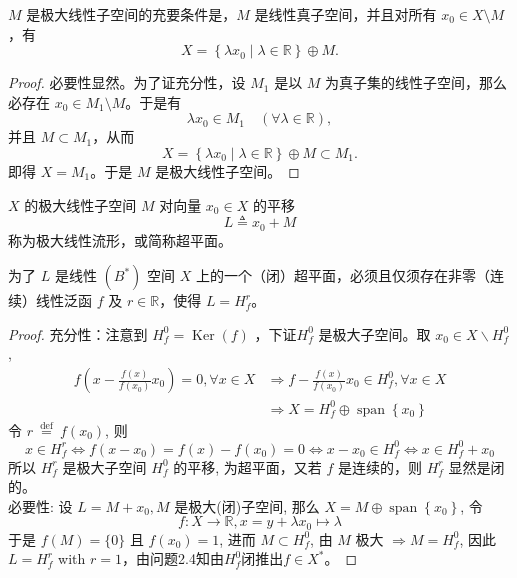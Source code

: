 \documentclass[lang=cn,newtx,10pt,scheme=chinese,thmcnt=chapter]{elegantbook}
\begin{document}
\begin{proposition}
    \( M \) 是极大线性子空间的充要条件是，\( M \) 是线性真子空间，并且对所有 \( x_0 \in X \setminus M \)，有
    \[
    X = \left\{ \lambda x_0 \mid \lambda \in \mathbb{R} \right\} \oplus M.
    \]
\end{proposition}

\begin{proof}
    必要性显然。为了证充分性，设 \( M_1 \) 是以 \( M \) 为真子集的线性子空间，那么必存在 \( x_0 \in M_1 \setminus M \)。于是有
    \[
    \lambda x_0 \in M_1 \quad (\forall \lambda \in \mathbb{R}),
    \]
    并且 \( M \subset M_1 \)，从而
    \[
    X = \left\{ \lambda x_0 \mid \lambda \in \mathbb{R} \right\} \oplus M \subset M_1.
    \]
    即得 \( X = M_1 \)。于是 \( M \) 是极大线性子空间。
\end{proof}



\begin{definition}
    \( X \) 的极大线性子空间 \( M \) 对向量 \( x_0 \in X \) 的平移
    \[
    L \triangleq x_0 + M
    \]
    称为极大线性流形，或简称超平面。
\end{definition}



\begin{theorem}
    为了 \( L \) 是线性 \( (B^*) \) 空间 \( X \) 上的一个（闭）超平面，必须且仅须存在非零（连续）线性泛函 \( f \) 及 \( r \in \mathbb{R} \)，使得 \( L = H_f^r \)。
\end{theorem}

\begin{proof}
 充分性：注意到 $H_f^0=\operatorname{Ker}(f)$ ，下证$H_f^0$ 是极大子空间。取 $x_0 \in X \backslash H_f^0$,
\begin{equation*}
\begin{aligned}
f\left(x-\frac{f(x)}{f\left(x_0\right)} x_0\right)=0, \forall x \in X & \Rightarrow f-\frac{f(x)}{f\left(x_0\right)} x_0 \in H_f^0, \forall x \in X \\
& \Rightarrow X=H_f^0 \oplus \operatorname{span}\left\{x_0\right\}
\end{aligned}
\end{equation*}
令 $r \stackrel{\text { def }}{=} f\left(x_0\right)$, 则
\begin{equation*}
x \in H_f^r \Leftrightarrow f\left(x-x_0\right)=f(x)-f\left(x_0\right)=0 \Leftrightarrow x-x_0 \in H_f^0 \Leftrightarrow x \in H_f^0+x_0
\end{equation*}
所以 $H_f^r$ 是极大子空间 $H_f^0$ 的平移, 为超平面，又若 \( f \) 是连续的，则 \( H_f^r \) 显然是闭的。\\
必要性: 设 $L=M+x_0, M$ 是极大(闭)子空间, 那么 $X=M \oplus \operatorname{span}\left\{x_0\right\}$, 令
\begin{equation*}
f: X \rightarrow \mathbb{R} , x=y+\lambda x_0 \mapsto \lambda
\end{equation*}
于是 $f(M)=\{0\}$ 且 $f\left(x_0\right)=1$, 进而 $M \subset H_f^0$, 由 $M$ 极大 $\Rightarrow M=H_f^0$, 因此 $L=H_f^r$ with $r=1$，由问题2.4知由$H_f^0$闭推出$f\in X^*$。
\end{proof}
\end{document}
